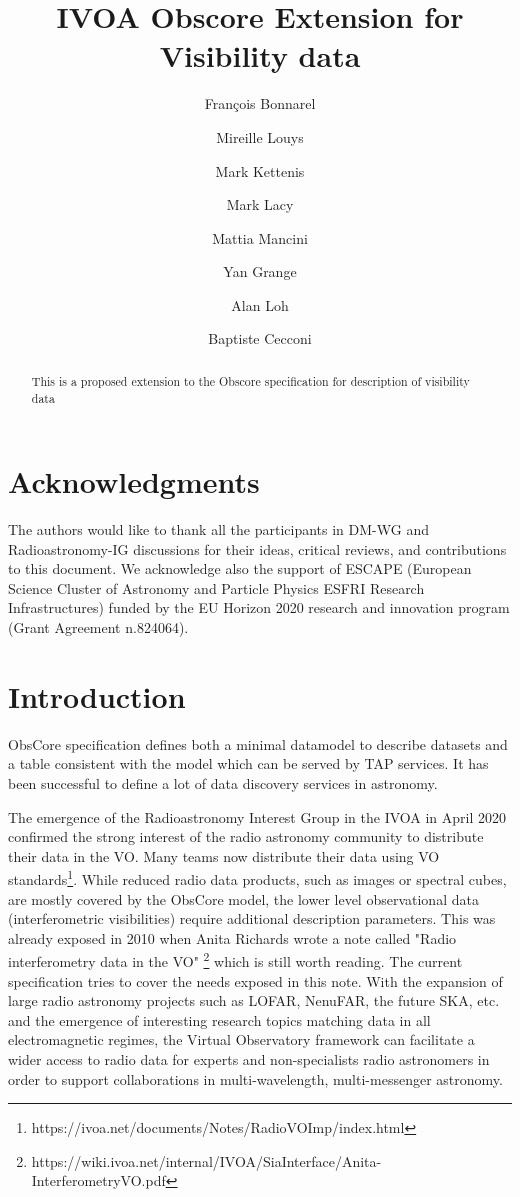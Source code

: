 \documentclass[11pt,a4paper]{ivoa}
\title{IVOA Obscore Extension for Visibility data}
\author{Fran\c cois Bonnarel}
\author{Mireille Louys}
\author{Mark Kettenis}
\author{Mark Lacy}
\author{Mattia Mancini}
\author{Yan Grange}
\author{Alan Loh}
\author{Baptiste Cecconi}
\begin{document}
\begin{abstract}
	This is a proposed extension to the Obscore specification for description of visibility data
\end{abstract}

\section*{Acknowledgments}

The authors would like to thank all the participants in DM-WG and Radioastronomy-IG discussions 
for their ideas, critical reviews, and contributions to this document.
We acknowledge also the support of ESCAPE (European Science Cluster of Astronomy
and Particle Physics ESFRI Research Infrastructures) funded by the EU Horizon
2020 research and innovation program (Grant Agreement n.824064).

\section{Introduction}


ObsCore specification \citep{std:OBSCORE} defines both a minimal datamodel to describe datasets 
and a table consistent with the model which can be served by TAP services. It has been successful 
to define a lot of data discovery services in astronomy.

The emergence of the Radioastronomy Interest Group in the IVOA in April 2020 confirmed the strong 
interest of the radio astronomy community to distribute their data in the VO. Many teams now 
distribute their data using VO standards\footnote{https://ivoa.net/documents/Notes/RadioVOImp/index.html}. 
While reduced radio data products, such as images or spectral cubes, %
are mostly covered by the ObsCore model, the lower level observational data 
(interferometric visibilities) require additional description parameters. This was already exposed 
in 2010 when Anita Richards wrote a note called "Radio interferometry data in the VO" 
\footnote{https://wiki.ivoa.net/internal/IVOA/SiaInterface/Anita-InterferometryVO.pdf} which is 
still worth reading. The current specification tries to cover the needs exposed in this note. 
With the expansion of large radio astronomy projects such as LOFAR, NenuFAR, the future SKA, etc. 
and the emergence of interesting research topics matching data in all electromagnetic regimes, the 
Virtual Observatory framework can facilitate a wider access to radio data for experts and 
non-specialists radio astronomers in order to support collaborations in multi-wavelength, 
multi-messenger astronomy. 
\end{document}
